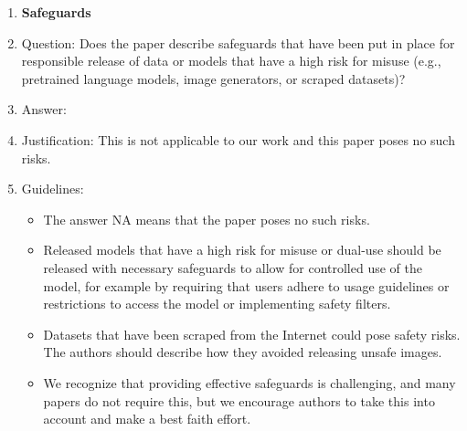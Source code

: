 \documentclass{article}
\begin{document}
\begin{enumerate}
\item {\bf Safeguards}
    \item[] Question: Does the paper describe safeguards that have been put in place for responsible release of data or models that have a high risk for misuse (e.g., pretrained language models, image generators, or scraped datasets)?
    \item[] Answer: \answerNA{} %
    \item[] Justification: This is not applicable to our work and this paper poses no such risks.
    \item[] Guidelines:
    \begin{itemize}
        \item The answer NA means that the paper poses no such risks.
        \item Released models that have a high risk for misuse or dual-use should be released with necessary safeguards to allow for controlled use of the model, for example by requiring that users adhere to usage guidelines or restrictions to access the model or implementing safety filters. 
        \item Datasets that have been scraped from the Internet could pose safety risks. The authors should describe how they avoided releasing unsafe images.
        \item We recognize that providing effective safeguards is challenging, and many papers do not require this, but we encourage authors to take this into account and make a best faith effort.
    \end{itemize}


\end{enumerate}
\end{document}
